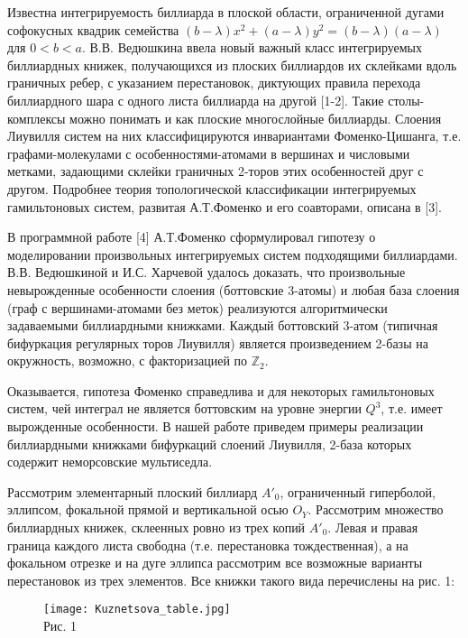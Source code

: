 
\vzmscaption


Известна интегрируемость биллиарда в плоской области, ограниченной дугами софокусных квадрик семейства $(b-\lambda)x^2+(a-\lambda)y^2=(b-\lambda)(a-\lambda)$ для $0<b<a$. В.В. Ведюшкина ввела новый важный класс интегрируемых биллиардных книжек, получающихся из плоских биллиардов их склейками вдоль граничных ребер, с указанием перестановок, диктующих правила перехода биллиардного шара с одного листа биллиарда на другой [1-2]. Такие столы-комплексы можно понимать и как плоские многослойные биллиарды. Слоения Лиувилля систем на них классифицируются инвариантами Фоменко-Цишанга, т.е. графами-молекулами с особенностями-атомами в вершинах и числовыми метками, задающими склейки граничных 2-торов этих особенностей друг с другом. Подробнее теория топологической классификации интегрируемых гамильтоновых систем, развитая А.Т.Фоменко и его соавторами, описана в [3].

В программной работе [4] А.Т.Фоменко сформулировал гипотезу о моделировании произвольных интегрируемых систем подходящими биллиардами. В.В. Ведюшкиной и И.С. Харчевой удалось доказать, что произвольные невырожденные особенности слоения (боттовские 3-атомы) и любая база слоения (граф с вершинами-атомами без меток) реализуются алгоритмически задаваемыми биллиардными книжками. Каждый боттовский 3-атом (типичная бифуркация регулярных торов Лиувилля) является произведением 2-базы на окружность, возможно, с факторизацией по $\mathbb{Z}_2$.

Оказывается, гипотеза Фоменко справедлива и для некоторых гамильтоновых систем, чей интеграл не является боттовским на уровне энергии $Q^3$, т.е. имеет вырожденные особенности. В нашей работе приведем примеры реализации биллиардными книжками бифуркаций слоений Лиувилля, 2-база которых содержит неморсовские мультиседла.

Рассмотрим элементарный плоский биллиард $A'_{0}$, ограниченный гиперболой, эллипсом, фокальной прямой и вертикальной осью $O_{Y}$. 
Рассмотрим множество биллиардных книжек, склеенных ровно из трех копий $A'_{0}$. Левая и правая граница каждого листа свободна (т.е. перестановка тождественная), а на фокальном отрезке и на дуге эллипса рассмотрим все возможные варианты перестановок из трех элементов. Все книжки такого вида перечислены на рис. 1:
\vspace*{-0.4cm} 
\begin{figure}[h!]
	\begin{center}
	\texttt{[image: Kuznetsova\_table.jpg]}\\
	Рис. 1
	\end{center}
\end{figure}
\vspace*{-1.1cm}\\

